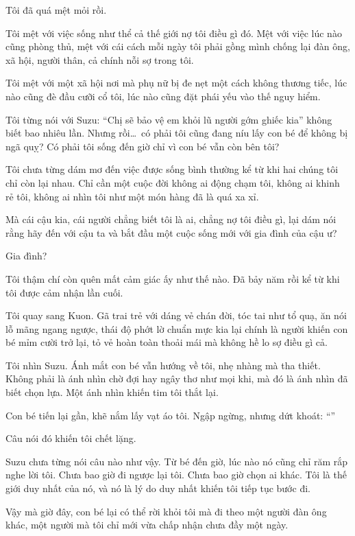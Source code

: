 \documentclass[../main.tex]{subfiles}
\begin{document}
Tôi đã quá mệt mỏi rồi.

Tôi mệt với việc sống như thể cả thế giới nợ tôi điều gì đó. Mệt với việc lúc nào cũng phòng thủ, mệt với cái cách mỗi ngày tôi phải gồng mình chống lại đàn ông, xã hội, người thân, cả chính nỗi sợ trong tôi.

Tôi mệt với một xã hội nơi mà phụ nữ bị đe nẹt một cách không thương tiếc, lúc nào cũng đè đầu cưỡi cổ tôi, lúc nào cũng đặt phái yếu vào thế nguy hiểm.

Tôi từng nói với Suzu: ``Chị sẽ bảo vệ em khỏi lũ người gớm ghiếc kia'' không biết bao nhiêu lần. Nhưng rồi\dots\ có phải tôi cũng đang níu lấy con bé để không bị ngã quỵ? Có phải tôi sống đến giờ chỉ vì con bé vẫn còn bên tôi?

Tôi chưa từng dám mơ đến việc được sống bình thường kể từ khi hai chúng tôi chỉ còn lại nhau. Chỉ cần một cuộc đời không ai động chạm tôi, không ai khinh rẻ tôi, không ai nhìn tôi như một món hàng đã là quá xa xỉ.

Mà cái cậu kia, cái người chẳng biết tôi là ai, chẳng nợ tôi điều gì, lại dám nói rằng hãy đến với cậu ta và bắt đầu một cuộc sống mới với gia đình của cậu ư?

Gia đình?

Tôi thậm chí còn quên mất cảm giác ấy như thế nào. Đã bảy năm rồi kể từ khi tôi được cảm nhận lần cuối.

Tôi quay sang Kuon. Gã trai trẻ với dáng vẻ chán đời, tóc tai như tổ quạ, ăn nói lỗ mãng ngang ngược, thái độ phớt lờ chuẩn mực kia lại chính là người khiến con bé mỉm cười trở lại, tỏ vẻ hoàn toàn thoải mái mà không hề lo sợ điều gì cả.

Tôi nhìn Suzu. Ánh mắt con bé vẫn hướng về tôi, nhẹ nhàng mà tha thiết. Không phải là ánh nhìn chờ đợi hay ngây thơ như mọi khi, mà đó là ánh nhìn đã biết chọn lựa. Một ánh nhìn khiến tim tôi thắt lại.

Con bé tiến lại gần, khẽ nắm lấy vạt áo tôi. Ngập ngừng, nhưng dứt khoát: ``''

Câu nói đó khiến tôi chết lặng.

Suzu chưa từng nói câu nào như vậy. Từ bé đến giờ, lúc nào nó cũng chỉ răm rắp nghe lời tôi. Chưa bao giờ đi ngược lại tôi. Chưa bao giờ chọn ai khác. Tôi là thế giới duy nhất của nó, và nó là lý do duy nhất khiến tôi tiếp tục bước đi.

Vậy mà giờ đây, con bé lại có thể rời khỏi tôi mà đi theo một người đàn ông khác, một người mà tôi chỉ mới vừa chấp nhận chưa đầy một ngày.
\end{document}

